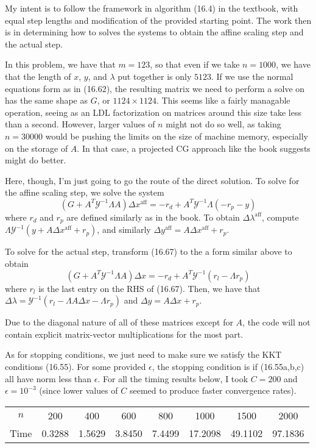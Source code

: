 \documentclass{article}
\newcommand{\ep}{\epsilon}
\begin{document}
My intent is to follow the framework in algorithm (16.4) in the textbook, with equal step lengths and modification of the provided starting point. The work then is in determining how to solves the systems to obtain the affine scaling step and the actual step. 

In this problem, we have that $m=123$, so that even if we take $n=1000$, we have that the length of $x$, $y$, and $\lambda$ put together is only $5123$. If we use the normal equations form as in (16.62), the resulting matrix we need to perform a solve on has the same shape as $G$, or $1124\times1124$. This seems like a fairly managable operation, seeing as an LDL factorization on matrices around this size take less than a second. However, larger values of $n$ might not do so well, as taking $n=30000$ would be pushing the limits on the size of machine memory, especially on the storage of $A$. In that case, a projected CG approach like the book suggests might do better.

Here, though, I'm just going to go the route of the direct solution. To solve for the affine scaling step, we solve the system
\[(G+A^T\mathscr{Y}^{-1}\Lambda A)\Delta x^\text{aff}=-r_d+A^T\mathscr{Y}^{-1}\Lambda(-r_p-y)\]
where $r_d$ and $r_p$ are defined similarly as in the book. To obtain $\Delta\lambda^\text{aff}$, compute $\Lambda\mathscr{Y}^{-1}(y+A\Delta x^\text{aff}+r_p)$, and similarly $\Delta y^\text{aff}=A\Delta x^\text{aff}+r_p$. 

To solve for the actual step, transform (16.67) to the a form similar above to obtain
\[(G+A^T\mathscr{Y}^{-1}\Lambda A)\Delta x=-r_d+A^T\mathscr{Y}^{-1}(r_l-\Lambda r_p)\]
where $r_l$ is the last entry on the RHS of (16.67). Then, we have that $\Delta\lambda=\mathscr{Y}^{-1}(r_l-\Lambda A\Delta x-\Lambda r_p)$ and $\Delta y=A\Delta x+r_p$.

Due to the diagonal nature of all of these matrices except for $A$, the code will not contain explicit matrix-vector multiplications for the most part.

As for stopping conditions, we just need to make sure we satisfy the KKT conditions (16.55). For some provided $\ep$, the stopping condition is if (16.55a,b,c) all have norm less than $\ep$.
For all the timing results below, I took $C=200$ and $\ep=10^{-3}$ (since lower values of $C$ seemed to produce faster convergence rates). 
\begin{tabular}{c|ccccccc}
    $n$&200&400&600&800&1000&1500&2000\\
    Time&0.3288&1.5629&3.8450&7.4499&17.2098&49.1102&97.1836\\
\end{tabular}
\end{document}
